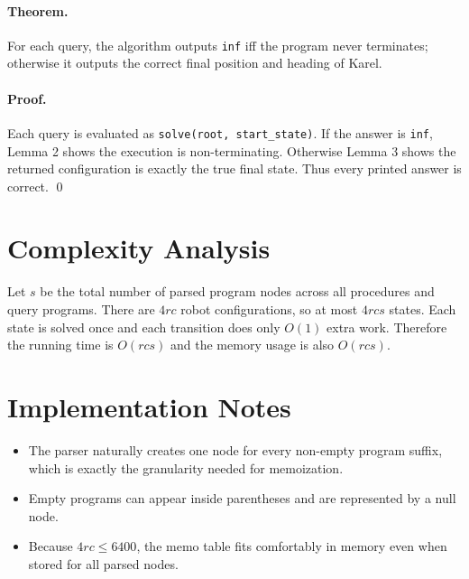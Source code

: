 \documentclass[11pt]{article}
\begin{document}
\paragraph{Theorem.}
For each query, the algorithm outputs \texttt{inf} iff the program never terminates; otherwise it outputs the
correct final position and heading of Karel.

\paragraph{Proof.}
Each query is evaluated as \texttt{solve(root, start\_state)}.
If the answer is \texttt{inf}, Lemma 2 shows the execution is non-terminating.
Otherwise Lemma 3 shows the returned configuration is exactly the true final state.
Thus every printed answer is correct. \qed

\section*{Complexity Analysis}

Let $s$ be the total number of parsed program nodes across all procedures and query programs.
There are $4rc$ robot configurations, so at most $4rcs$ states.
Each state is solved once and each transition does only $O(1)$ extra work.
Therefore the running time is $O(rcs)$ and the memory usage is also $O(rcs)$.

\section*{Implementation Notes}

\begin{itemize}[leftmargin=*]
    \item The parser naturally creates one node for every non-empty program suffix, which is exactly the
    granularity needed for memoization.
    \item Empty programs can appear inside parentheses and are represented by a null node.
    \item Because $4rc \le 6400$, the memo table fits comfortably in memory even when stored for all
    parsed nodes.
\end{itemize}
\end{document}
